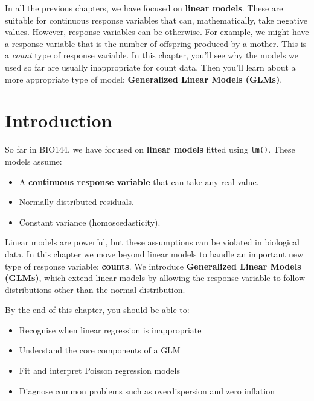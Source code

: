 \documentclass[
  letterpaper,
  8pt,
  a4paper]{book}
\providecommand{\tightlist}{%
  \setlength{\itemsep}{0pt}\setlength{\parskip}{0pt}}
\begin{document}
In all the previous chapters, we have focused on \textbf{linear models}.
These are suitable for continuous response variables that can,
mathematically, take negative values. However, response variables can be
otherwise. For example, we might have a response variable that is the
number of offspring produced by a mother. This is a \emph{count} type of
response variable. In this chapter, you'll see why the models we used so
far are usually inappropriate for count data. Then you'll learn about a
more appropriate type of model: \textbf{Generalized Linear Models
(GLMs)}.

\section*{Introduction}\label{introduction-5}


So far in BIO144, we have focused on \textbf{linear models} fitted using
\texttt{lm()}. These models assume:

\begin{itemize}
\tightlist
\item
  A \textbf{continuous response variable} that can take any real value.
\item
  Normally distributed residuals.
\item
  Constant variance (homoscedasticity).
\end{itemize}

Linear models are powerful, but these assumptions can be violated in
biological data. In this chapter we move beyond linear models to handle
an important new type of response variable: \textbf{counts}. We
introduce \textbf{Generalized Linear Models (GLMs)}, which extend linear
models by allowing the response variable to follow distributions other
than the normal distribution.

By the end of this chapter, you should be able to:

\begin{itemize}
\tightlist
\item
  Recognise when linear regression is inappropriate
\item
  Understand the core components of a GLM
\item
  Fit and interpret Poisson regression models
\item
  Diagnose common problems such as overdispersion and zero inflation
\end{itemize}
\end{document}
